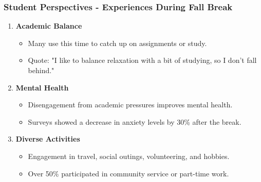 \documentclass[aspectratio=169]{beamer}
\begin{document}
\begin{frame}[fragile]
    \frametitle{Student Perspectives - Experiences During Fall Break}
    \begin{enumerate}
        \item \textbf{Academic Balance}
            \begin{itemize}
                \item Many use this time to catch up on assignments or study.
                \item Quote: "I like to balance relaxation with a bit of studying, so I don’t fall behind."
            \end{itemize}
        
        \item \textbf{Mental Health}
            \begin{itemize}
                \item Disengagement from academic pressures improves mental health.
                \item Surveys showed a decrease in anxiety levels by 30\% after the break.
            \end{itemize}
        
        \item \textbf{Diverse Activities}
            \begin{itemize}
                \item Engagement in travel, social outings, volunteering, and hobbies.
                \item Over 50\% participated in community service or part-time work.
            \end{itemize}
    \end{enumerate}
\end{frame}
\end{document}
